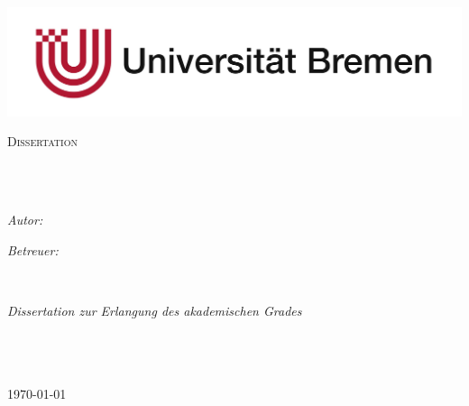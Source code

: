 \documentclass[11pt,english,onehalfspacing,headsepline]{MastersDoctoralThesis}
\author{Kai Michael \textsc{Renken}} %
\begin{document}
\frontmatter %

\pagestyle{plain} %


\begin{titlepage}
\begin{center}

\includegraphics[scale=0.3]{Logo.jpg} %

\textsc{\Large Dissertation}\\[0.5cm] %

\HRule \\[0.4cm] %
{\huge \bfseries \ttitle\par}\vspace{0.4cm} %
\HRule \\[1.5cm] %
 
\begin{minipage}[t]{0.4\textwidth}
\begin{flushleft} \large
\emph{Autor:}\\
{\authorname} %
\end{flushleft}
\end{minipage}
\begin{minipage}[t]{0.4\textwidth}
\begin{flushright} \large
\emph{Betreuer:} \\
{\supname} %
\end{flushright}
\end{minipage}\\[3cm]
 
\vfill

\large \textit{Dissertation zur Erlangung des akademischen Grades \\ \degreename}\\[0.3cm] %
\textit{}\\[0.4cm]
\facname\\[2cm] %
 
\vfill

{\large \myformat\today}\\[4cm] %
 
\vfill
\end{center}
\end{titlepage}
\end{document}
